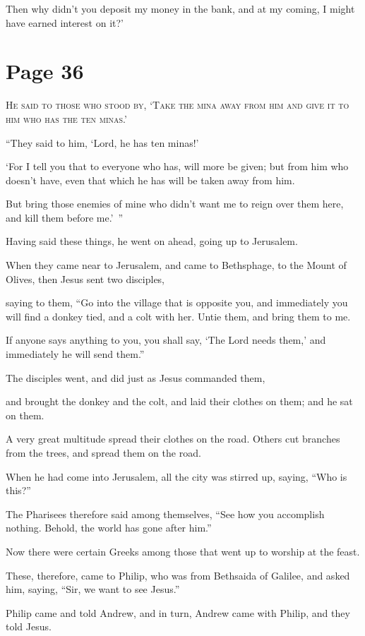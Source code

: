 Then why didn’t you deposit my money in the bank, and at my coming, I might have earned interest on it?’



\chapterornament
\section*{Page 36}

\lettrine{H}{e said to those who stood by, ‘Take the mina away from him and give it to him who has the ten minas.’}

“They said to him, ‘Lord, he has ten minas!’

‘For I tell you that to everyone who has, will more be given; but from him who doesn’t have, even that which he has will be taken away from him.

But bring those enemies of mine who didn’t want me to reign over them here, and kill them before me.’ ”

Having said these things, he went on ahead, going up to Jerusalem.

When they came near to Jerusalem, and came to Bethsphage, to the Mount of Olives, then Jesus sent two disciples,

saying to them, “Go into the village that is opposite you, and immediately you will find a donkey tied, and a colt with her. Untie them, and bring them to me.

If anyone says anything to you, you shall say, ‘The Lord needs them,’ and immediately he will send them.”

The disciples went, and did just as Jesus commanded them,

and brought the donkey and the colt, and laid their clothes on them; and he sat on them.

A very great multitude spread their clothes on the road. Others cut branches from the trees, and spread them on the road.

When he had come into Jerusalem, all the city was stirred up, saying, “Who is this?”

The Pharisees therefore said among themselves, “See how you accomplish nothing. Behold, the world has gone after him.”

Now there were certain Greeks among those that went up to worship at the feast.

These, therefore, came to Philip, who was from Bethsaida of Galilee, and asked him, saying, “Sir, we want to see Jesus.”

Philip came and told Andrew, and in turn, Andrew came with Philip, and they told Jesus.

